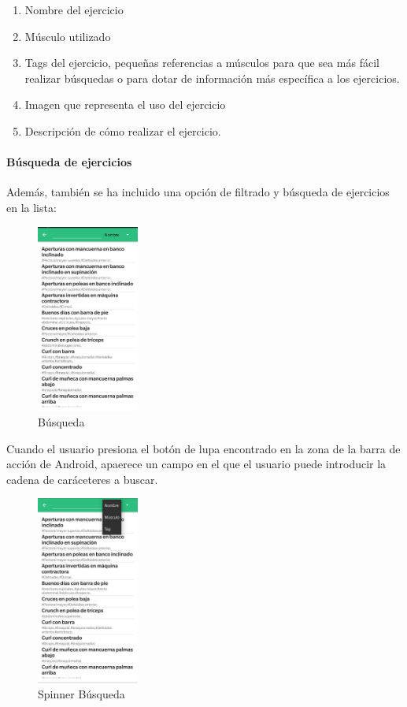 \documentclass[11pt,a4paper]{report}
\begin{document}
\begin{enumerate}
	\item Nombre del ejercicio

	\item Músculo utilizado

	\item Tags del ejercicio, pequeñas referencias a músculos para que sea más fácil realizar búsquedas o para dotar de información más específica a los ejercicios.

	\item Imagen que representa el uso del ejercicio

	\item Descripción de cómo realizar el ejercicio.

\end{enumerate}
\paragraph{Búsqueda de ejercicios}

Además, también se ha incluido una opción de filtrado y búsqueda de ejercicios en la lista:
\begin{figure}[H]
	\centering
	\includegraphics[width=0.3\textwidth]{graficos/manual/Busqueda.jpg}
	\caption{Búsqueda}
\end{figure}

Cuando el usuario presiona el botón de lupa encontrado en la zona de la barra de acción de Android, apaerece un campo en el que el usuario puede introducir la cadena de caráceteres a buscar.
\begin{figure}[H]
	\centering
	\includegraphics[width=0.3\textwidth]{graficos/manual/SpinnerBusqueda.jpg}
	\caption{Spinner Búsqueda}
\end{figure}
\end{document}
